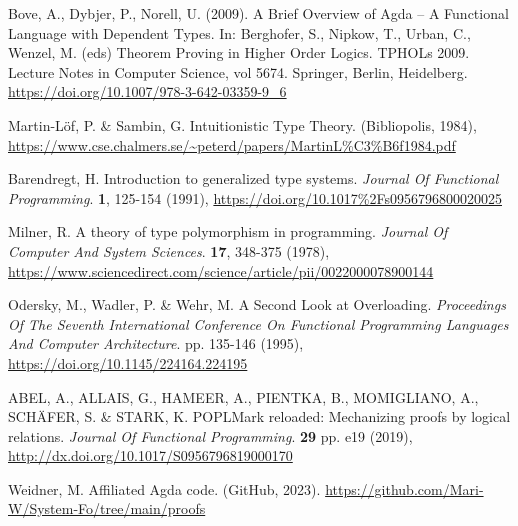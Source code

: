 
 Bove, A., Dybjer, P., Norell, U. (2009). A Brief Overview of Agda – A Functional Language with Dependent Types. In: Berghofer, S., Nipkow, T., Urban, C., Wenzel, M. (eds) Theorem Proving in Higher Order Logics. TPHOLs 2009. Lecture Notes in Computer Science, vol 5674. Springer, Berlin, Heidelberg. \url{https://doi.org/10.1007/978-3-642-03359-9_6}

 Martin-Löf, P. \& Sambin, G. Intuitionistic Type Theory. (Bibliopolis, 1984), \url{https://www.cse.chalmers.se/~peterd/papers/MartinL%C3%B6f1984.pdf}

 Barendregt, H. Introduction to generalized type systems. {\em Journal Of Functional Programming}. \textbf{1}, 125-154 (1991), \url{https://doi.org/10.1017%2Fs0956796800020025}

 Milner, R. A theory of type polymorphism in programming. 
{\em Journal Of Computer And System Sciences}. 
\textbf{17}, 348-375 (1978), \url{https://www.sciencedirect.com/science/article/pii/0022000078900144}


 Odersky, M., Wadler, P. \& Wehr, M. A Second Look at Overloading. 
{\em Proceedings Of The Seventh International Conference On Functional Programming Languages And Computer Architecture}. 
pp. 135-146 (1995), \url{https://doi.org/10.1145/224164.224195}

ABEL, A., ALLAIS, G., HAMEER, A., PIENTKA, B., MOMIGLIANO, A., SCHÄFER, S. \& STARK, K. POPLMark reloaded: Mechanizing proofs by logical relations. {\em Journal Of Functional Programming}. \textbf{29} pp. e19 (2019), \url{http://dx.doi.org/10.1017/S0956796819000170}

 Weidner, M. Affiliated Agda code. (GitHub, 2023). \url{https://github.com/Mari-W/System-Fo/tree/main/proofs}
